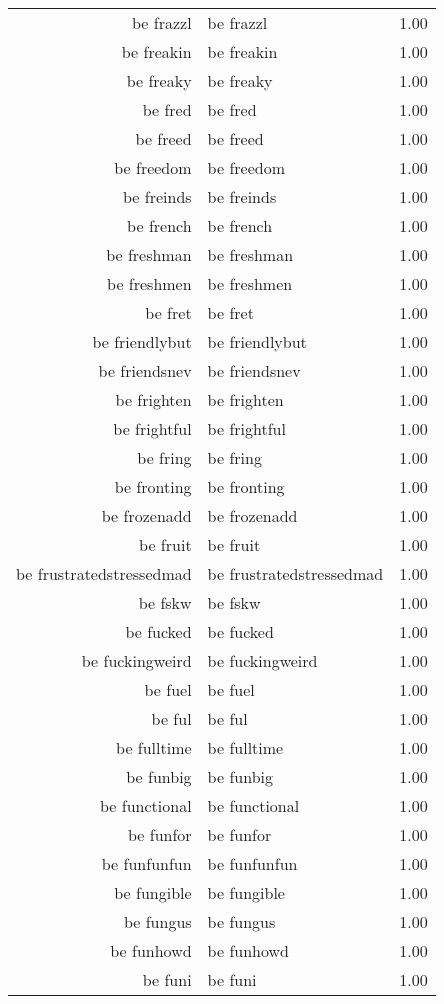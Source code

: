 \begin{table}[ht]
\begin{tabular}{rlr}
  be frazzl & be frazzl & 1.00 \\ 
  be freakin & be freakin & 1.00 \\ 
  be freaky & be freaky & 1.00 \\ 
  be fred & be fred & 1.00 \\ 
  be freed & be freed & 1.00 \\ 
  be freedom & be freedom & 1.00 \\ 
  be freinds & be freinds & 1.00 \\ 
  be french & be french & 1.00 \\ 
  be freshman & be freshman & 1.00 \\ 
  be freshmen & be freshmen & 1.00 \\ 
  be fret & be fret & 1.00 \\ 
  be friendlybut & be friendlybut & 1.00 \\ 
  be friendsnev & be friendsnev & 1.00 \\ 
  be frighten & be frighten & 1.00 \\ 
  be frightful & be frightful & 1.00 \\ 
  be fring & be fring & 1.00 \\ 
  be fronting & be fronting & 1.00 \\ 
  be frozenadd & be frozenadd & 1.00 \\ 
  be fruit & be fruit & 1.00 \\ 
  be frustratedstressedmad & be frustratedstressedmad & 1.00 \\ 
  be fskw & be fskw & 1.00 \\ 
  be fucked & be fucked & 1.00 \\ 
  be fuckingweird & be fuckingweird & 1.00 \\ 
  be fuel & be fuel & 1.00 \\ 
  be ful & be ful & 1.00 \\ 
  be fulltime & be fulltime & 1.00 \\ 
  be funbig & be funbig & 1.00 \\ 
  be functional & be functional & 1.00 \\ 
  be funfor & be funfor & 1.00 \\ 
  be funfunfun & be funfunfun & 1.00 \\ 
  be fungible & be fungible & 1.00 \\ 
  be fungus & be fungus & 1.00 \\ 
  be funhowd & be funhowd & 1.00 \\ 
  be funi & be funi & 1.00 \\ 

\end{tabular}
\end{table}
